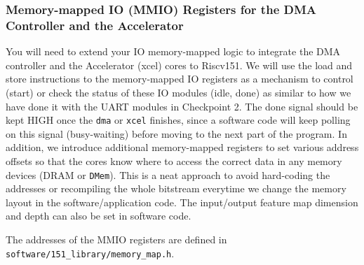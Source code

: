 \documentclass[11pt]{article}
\begin{document}
\subsubsection{Memory-mapped IO (MMIO) Registers for the DMA Controller and the Accelerator}

You will need to extend your IO memory-mapped logic to integrate the DMA controller and the Accelerator (xcel) cores to Riscv151. We will use the load and store instructions to the memory-mapped IO registers as a mechanism to control (start) or check the status of these IO modules (idle, done) as similar to how we have done it with the UART modules in Checkpoint 2. The done signal should be kept HIGH once the \texttt{dma} or \texttt{xcel} finishes, since a software code will keep polling on this signal (busy-waiting) before moving to the next part of the program. In addition, we introduce additional memory-mapped registers to set various address offsets so that the cores know where to access the correct data in any memory devices (DRAM or \texttt{DMem}). This is a neat approach to avoid hard-coding the addresses or recompiling the whole bitstream everytime we change the memory layout in the software/application code. The input/output feature map dimension and depth can also be set in software code.

The addresses of the MMIO registers are defined in \verb|software/151_library/memory_map.h|.
\end{document}
